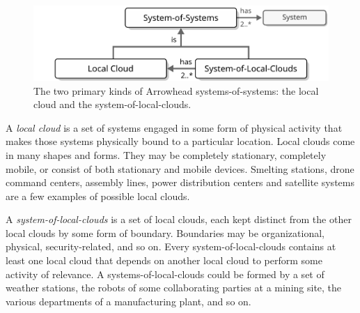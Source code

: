 \begin{figure}[ht!]
  \centering
  \includegraphics[scale=0.9]{figures/system-of-systems}
  \caption{
    The two primary kinds of Arrowhead systems-of-systems: the local cloud and the system-of-local-clouds.
  }
  \label{fig:system-of-systems}
\end{figure}

A \textit{local cloud} is a set of systems engaged in some form of physical activity that makes those systems physically bound to a particular location.
Local clouds come in many shapes and forms.
They may be completely stationary, completely mobile, or consist of both stationary and mobile devices.
Smelting stations, drone command centers, assembly lines, power distribution centers and satellite systems are a few examples of possible local clouds.

A \textit{system-of-local-clouds} is a set of local clouds, each kept distinct from the other local clouds by some form of boundary.
Boundaries may be organizational, physical, security-related, and so on.
Every system-of-local-clouds contains at least one local cloud that depends on another local cloud to perform some activity of relevance.
A systems-of-local-clouds could be formed by a set of weather stations, the robots of some collaborating parties at a mining site, the various departments of a manufacturing plant, and so on.
